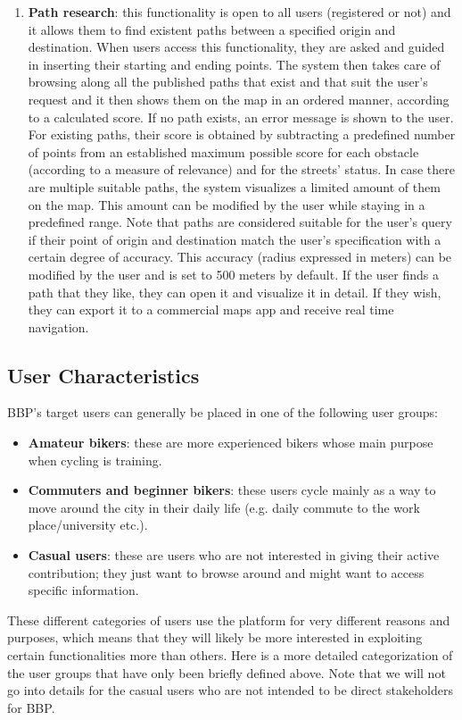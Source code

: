 \documentclass{article}
\begin{document}
\begin{enumerate}
    \item \textbf{Path research}: this functionality is open to all users (registered or not) and it allows them to find existent paths between a specified origin and destination. When users access this functionality, they are asked and guided in inserting their starting and ending points. The system then takes care of browsing along all the published paths that exist and that suit the user's request and it then shows them on the map in an ordered manner, according to a calculated score. If no path exists, an error message is shown to the user. For existing paths, their score is obtained by subtracting a predefined number of points from an established maximum possible score for each obstacle (according to a measure of relevance) and for the streets' status. In case there are multiple suitable paths, the system visualizes a limited amount of them on the map. This amount can be modified by the user while staying in a predefined range. Note that paths are considered suitable for the user's query if their point of origin and destination match the user's specification with a certain degree of accuracy. This accuracy (radius expressed in meters) can be modified by the user and is set to 500 meters by default. If the user finds a path that they like, they can open it and visualize it in detail. If they wish, they can export it to a commercial maps app and receive real time navigation.
\end{enumerate}

\subsection{User Characteristics}
BBP's target users can generally be placed in one of the following user groups: 
\begin{itemize}
    \item \textbf{Amateur bikers}: these are more experienced bikers whose main purpose when cycling is training. 
    \item \textbf{Commuters and beginner bikers}: these users cycle mainly as a way to move around the city in their daily life (e.g. daily commute to the work place/university etc.).
    \item \textbf{Casual users}: these are users who are not interested in giving their active contribution; they just want to browse around and might want to access specific information.
\end{itemize}
These different categories of users use the platform for very different reasons and purposes, which means that they will likely be more interested in exploiting certain functionalities more than others. Here is a more detailed categorization of the user groups that have only been briefly defined above. Note that we will not go into details for the casual users who are not intended to be direct stakeholders for BBP.
\end{document}

